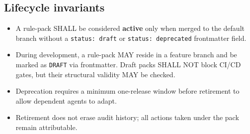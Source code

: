 \subsection{Lifecycle invariants}

\begin{itemize}
  \item A rule-pack SHALL be considered \textbf{active} only when merged
    to the default branch without a \texttt{status: draft} or
    \texttt{status: deprecated} frontmatter field.
  \item During development, a rule-pack MAY reside in a feature branch
    and be marked as \texttt{DRAFT} via frontmatter. Draft packs SHALL
    NOT block CI/CD gates, but their structural validity MAY be checked.
  \item Deprecation requires a minimum one-release window before
    retirement to allow dependent agents to adapt.
  \item Retirement does not erase audit history; all actions taken under
    the pack remain attributable.
\end{itemize}
